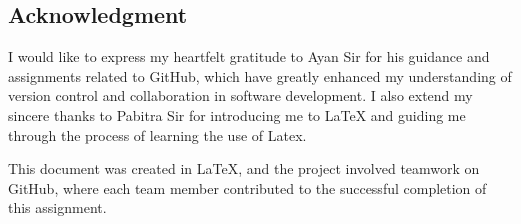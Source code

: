 
\begin{mdframed}[linecolor=white]
    
\section*{Acknowledgment}

I would like to express my heartfelt gratitude to Ayan Sir for his guidance and assignments related to GitHub, which have greatly enhanced my understanding of version control and collaboration in software development. I also extend my sincere thanks to Pabitra Sir for introducing me to LaTeX and guiding me through the process of learning the use of Latex.

This document was created in LaTeX, and the project involved teamwork on GitHub, where each team member contributed to the successful completion of this assignment.

\vspace{2cm}

\noindent\makebox[\textwidth][r]{\underline{\hspace{5cm}}} 
\noindent{} 

\end{mdframed}
